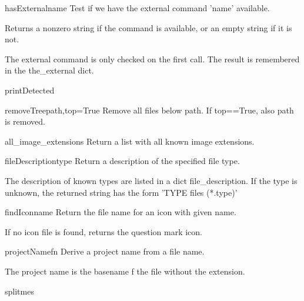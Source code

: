 \begin{funcdesc}{hasExternal}{name}
Test if we have the external command 'name' available.

    Returns a nonzero string if the command is available,
    or an empty string if it is not.

    The external command is only checked on the first call.
    The result is remembered in the the_external dict.
    

\end{funcdesc}


\begin{funcdesc}{printDetected}{}


\end{funcdesc}


\begin{funcdesc}{removeTree}{path,top=True}
Remove all files below path. If top==True, also path is removed.

\end{funcdesc}


\begin{funcdesc}{all_image_extensions}{}
Return a list with all known image extensions.

\end{funcdesc}


\begin{funcdesc}{fileDescription}{type}
Return a description of the specified file type.

    The description of known types are listed in a dict file_description.
    If the type is unknown, the returned string has the form
    'TYPE files (*.type)'
    

\end{funcdesc}


\begin{funcdesc}{findIcon}{name}
Return the file name for an icon with given name.

    If no icon file is found, returns the question mark icon.
    

\end{funcdesc}


\begin{funcdesc}{projectName}{fn}
Derive a project name from a file name.

    The project name is the basename f the file without the extension.
    

\end{funcdesc}


\begin{funcdesc}{splitme}{s}


\end{funcdesc}


